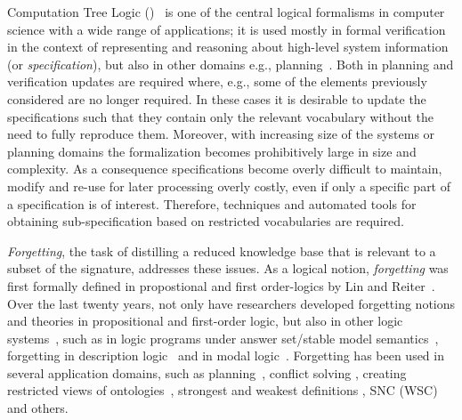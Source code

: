 \documentclass{article}
\begin{document}
Computation Tree Logic (\CTL)~\cite{clarke1981design} is one of the central logical formalisms in computer science with a wide range of applications; it is used mostly in formal verification in the context of representing and reasoning about high-level system information (or \emph{specification}), but also in other domains e.g., planning~\cite{giunchiglia1999planning,dal2002planning,akintunde2017planning}.
Both in planning and verification updates are required where, e.g., some of the elements previously considered are no longer required. In these cases it is desirable to update the specifications such that they contain only the relevant vocabulary without the need to fully reproduce them. Moreover, with increasing size of the systems or planning domains the formalization becomes prohibitively large in size and complexity. As a consequence specifications become overly difficult to maintain, modify and re-use for later processing overly costly, even if only a specific part of a specification is of interest. Therefore, techniques and automated tools for obtaining sub-specification based on restricted vocabularies are required.

\emph{Forgetting}, the task of distilling a reduced knowledge base that is relevant to a subset of the signature, addresses these issues.
As a logical notion, \emph{forgetting} was first formally defined
in propostional and first order-logics by Lin and Reiter~\cite{lin1994forget}.
Over the last twenty years, not only have researchers developed forgetting notions and theories in propositional and first-order logic, but also in other logic systems~\cite{eiter2019brief}, such as in logic programs under answer set/stable model semantics~\cite{DBLP:Zhang:AIJ2006,Eiter2008Semantic,Wong:PhD:Thesis,Yisong:KR:2012,Yisong:IJCAI:2013}, forgetting in description logic~\cite{Wang:AMAI:2010,Lutz:IJCAI:2011,zhao2017role} and in modal logic~\cite{Yan:AIJ:2009,Kaile:JAIR:2009,Yongmei:IJCAI:2011,fang2019forgetting}. Forgetting has been used in several application domains, such as planning~\cite{lin2003compiling},  conflict solving \cite{Lang2010Reasoning,Zhang2005Solving},
creating restricted views of ontologies~\cite{zhao2017role},
strongest and weakest definitions \cite{Lang2008On}, SNC (WSC) \cite{DBLP:journals/ai/Lin01} and others.
\end{document}
